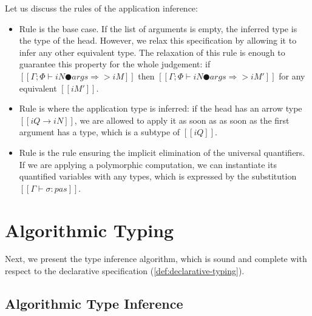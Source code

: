 \documentclass[a4,natbib=false]{article}
\newcommand{\ruleref}[1]{Rule \nameref{#1}}
\begin{document}
Let us discuss the rules of the application inference:
\begin{itemize}
  \item \ruleref{\ottdruleDTEmptyAppLabel} 
    is the base case. If the list of arguments is empty, 
    the inferred type is the type of the head. 
    However, we relax this specification by allowing it to 
    infer any other equivalent type. 
    The relaxation of this rule is enough to guarantee 
    this property for the whole judgement:
    if $[[Γ ; Φ ⊢ iN ● args ⇒> iM]]$ then 
    $[[Γ ; Φ ⊢ iN ● args ⇒> iM']]$ for any equivalent 
    $[[iM']]$.
  \item \ruleref{\ottdruleDTArrowAppLabel}
    is where the application type is inferred: 
    if the head has an arrow type $[[iQ → iN]]$,
     we are allowed to apply it as soon as 
    as soon as the first argument has a type, which is a subtype of $[[iQ]]$.
  \item \ruleref{\ottdruleDTForallAppLabel}
    is the rule ensuring the implicit elimination of the universal quantifiers. 
    If we are applying a polymorphic computation, 
    we can instantiate its quantified variables with any types,
    which is expressed by the substitution $[[Γ ⊢ σ : {pas}]]$.
\end{itemize}



\section{Algorithmic Typing}

Next, we present the type inference algorithm, 
which is sound and complete with respect to the declarative specification
(\cref{def:declarative-typing}).

\subsection{Algorithmic Type Inference}
\end{document}
